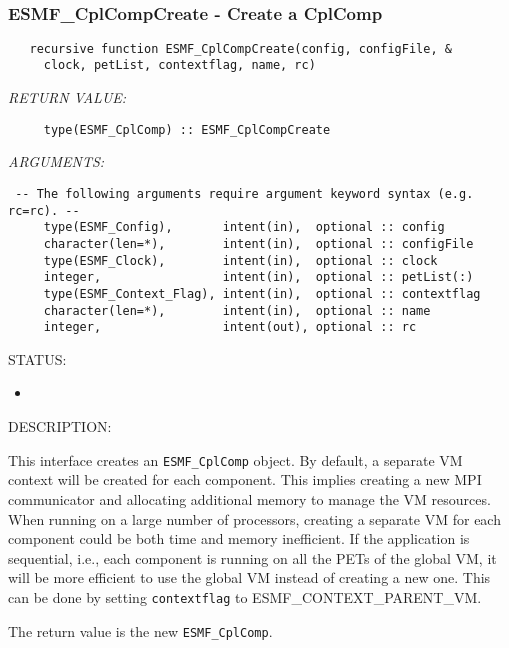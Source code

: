 
\mbox{}\hrulefill\ 
 
\subsubsection [ESMF\_CplCompCreate] {ESMF\_CplCompCreate - Create a CplComp}


  
\begin{verbatim}   recursive function ESMF_CplCompCreate(config, configFile, &
     clock, petList, contextflag, name, rc)\end{verbatim}{\em RETURN VALUE:}
\begin{verbatim}     type(ESMF_CplComp) :: ESMF_CplCompCreate\end{verbatim}{\em ARGUMENTS:}
\begin{verbatim} -- The following arguments require argument keyword syntax (e.g. rc=rc). --
     type(ESMF_Config),       intent(in),  optional :: config
     character(len=*),        intent(in),  optional :: configFile
     type(ESMF_Clock),        intent(in),  optional :: clock
     integer,                 intent(in),  optional :: petList(:)
     type(ESMF_Context_Flag), intent(in),  optional :: contextflag
     character(len=*),        intent(in),  optional :: name
     integer,                 intent(out), optional :: rc\end{verbatim}
{\sf STATUS:}
   \begin{itemize}
   \item{}
   \end{itemize}
  
{\sf DESCRIPTION:\\ }


   This interface creates an {\tt ESMF\_CplComp} object. By default, a
   separate VM context will be created for each component.  This implies
   creating a new MPI communicator and allocating additional memory to
   manage the VM resources. When running on a large number of processors,
   creating a separate VM for each component could be both time and memory
   inefficient.  If the application is sequential, i.e., each component is
   running on all the PETs of the global VM, it will be more efficient to use
   the global VM instead of creating a new one.  This can be done by setting
   {\tt contextflag} to ESMF\_CONTEXT\_PARENT\_VM.
  
   The return value is the new {\tt ESMF\_CplComp}.
  
